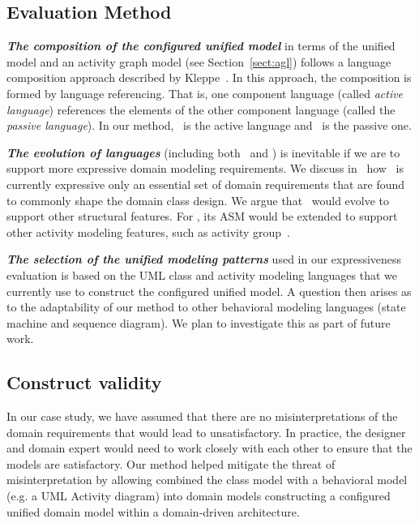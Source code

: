 \subsection{Evaluation Method}
%

\textbf{\textit{The composition of the configured unified model}} in terms of the unified model and an activity graph model (see Section~\ref{sect:agl}) follows a language composition approach described by Kleppe~\cite{kleppe_software_2008}. In this approach, the composition is formed by language referencing. That is, one component language (called \textit{active language}) references the elements of the other component language (called the \textit{passive language}). In our method, \agl~is the active language and \dcsl~is the passive one.

\textbf{\textit{The evolution of languages}} (including both \agl~and \dcsl) is inevitable if we are to support 
more expressive domain modeling requirements. We discuss in~\cite{le_domain_2018} how \dcsl~is currently expressive only \wrt an essential set of domain requirements that are found to commonly shape the domain class design. We argue that \dcsl~would evolve to support other structural features. For \agl, its ASM would be extended to support other activity modeling features, such as activity group~\cite{omg_unified_2015}.

\textbf{\textit{The selection of the unified modeling patterns}} used in our expressiveness evaluation is based on the UML class and activity modeling languages that we currently use to construct the configured unified model. A question then arises as to the adaptability of our method to other behavioral modeling languages (\eg state machine and sequence diagram). We plan to investigate this as part of future work.
%
\subsection{Construct validity}
In our case study, we have assumed that there are no misinterpretations of the domain requirements that would lead to unsatisfactory. In practice, the designer and domain expert would need to work closely with each other to ensure that the models are satisfactory.
Our method helped mitigate the threat of misinterpretation by allowing combined the class model with a behavioral model (e.g. a UML Activity
diagram) into domain models constructing a configured unified domain model within a domain-driven architecture.
%
